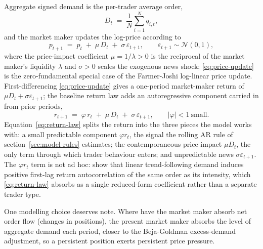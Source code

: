 \documentclass[12pt]{article}
\begin{document}
Aggregate signed demand is the per-trader average order,
\begin{equation}
  D_t \;=\; \frac{1}{N} \sum_{i=1}^{N} q_{i,t},
  \label{eq:aggregate-demand}
\end{equation}
and the market maker updates the log-price according to
\begin{equation}
  p_{t+1} \;=\; p_t \;+\; \mu\, D_t \;+\; \sigma\, \varepsilon_{t+1}, \qquad \varepsilon_{t+1} \sim \mathcal{N}(0, 1),
  \label{eq:price-update}
\end{equation}
where the price-impact coefficient $\mu = 1/\lambda > 0$ is the reciprocal of the market maker's liquidity $\lambda$ and $\sigma > 0$ scales the exogenous news shock; \eqref{eq:price-update} is the zero-fundamental special case of the Farmer-Joshi log-linear price update. %
First-differencing \eqref{eq:price-update} gives a one-period market-maker return of $\mu D_t + \sigma\varepsilon_{t+1}$; the baseline return law adds an autoregressive component carried in from prior periods,
\begin{equation}
  r_{t+1} \;=\; \varphi\, r_t \;+\; \mu\, D_t \;+\; \sigma\, \varepsilon_{t+1}, \qquad |\varphi| < 1\ \text{small.}
  \label{eq:return-law}
\end{equation}
Equation~\eqref{eq:return-law} splits the return into the three pieces the model works with: a small predictable component $\varphi r_t$, the signal the rolling AR rule of section~\ref{sec:model-rules} estimates; the contemporaneous price impact $\mu D_t$, the only term through which trader behaviour enters; and unpredictable news $\sigma\varepsilon_{t+1}$. The $\varphi r_t$ term is not ad hoc: \citet{farmerjoshi2002} show that linear trend-following demand induces positive first-lag return autocorrelation of the same order as its intensity, which \eqref{eq:return-law} absorbs as a single reduced-form coefficient rather than a separate trader type. %

One modelling choice deserves note. Where \citet{farmerjoshi2002} have the market maker absorb net order flow (changes in positions), the present market maker absorbs the level of aggregate demand each period, closer to the Beja-Goldman excess-demand adjustment, so a persistent position exerts persistent price pressure. %
\end{document}
